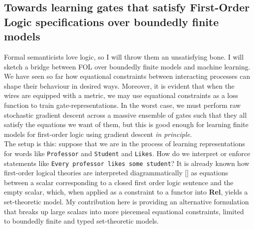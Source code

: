 \begin{fullwidth}

\section{Towards learning gates that satisfy First-Order Logic specifications over boundedly finite models}

Formal semanticists love logic, so I will throw them an unsatisfying bone. I will sketch a bridge between FOL over boundedly finite models and machine learning. We have seen so far how equational constraints between interacting processes can shape their behaviour in desired ways. Moreover, it is evident that when the wires are equipped with a metric, we may use equational constraints as a loss function to train gate-representations. In the worst case, we must perform raw stochastic gradient descent across a massive ensemble of gates such that they all satisfy the equations we want of them, but this is good enough for learning finite models for first-order logic using gradient descent \emph{in principle}.\\

The setup is this: suppose that we are in the process of learning representations for words like \texttt{Professor} and \texttt{Student} and \texttt{Likes}. How do we interpret or enforce statements like \texttt{Every professor likes some student}? It is already known how first-order logical theories are interpreted diagrammatically [] as equations between a scalar corresponding to a closed first order logic sentence and the empty scalar, which, when applied as a constraint to a functor into \textbf{Rel}, yields a set-theoretic model. My contribution here is providing an alternative formulation that breaks up large scalars into more piecemeal equational constraints, limited to boundedly finite and typed set-theoretic models.\\


\end{fullwidth}
